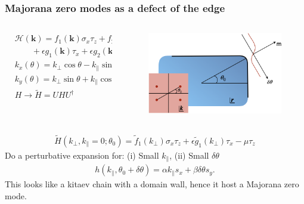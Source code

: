 \documentclass{beamer}
\renewcommand{\(}{\left(}
\renewcommand{\)}{\right)}
\renewcommand{\[}{\left[}
\renewcommand{\]}{\right]}
\begin{document}
\begin{frame}
    \frametitle{Majorana zero modes as a defect of the edge}
    \begin{columns}
        \begin{column}{0.55\textwidth}
            \begin{align*}
                &\mathcal{H}(\bm k) = f_1 (\bm k) \sigma_x\tau_z + f_2(\bm k) \sigma_z\tau_z  \\
                & \qquad + \epsilon g_1(\bm k) \tau_x + \epsilon g_2(\bm k) \tau_y - \mu\tau_z \\ 
                &k_x(\theta)=k_\perp \cos\theta - k_\| \sin\theta \nonumber\\
                &k_y(\theta)=k_\perp \sin\theta + k_\| \cos\theta \\
                &H\to \tilde H= UHU^\dagger \\ 
                \end{align*}
        \end{column}
        \begin{column}{0.45\textwidth}
            \begin{figure}[]
                \centering
                \includegraphics[scale=0.35]{corner_without_C4.png}
            \end{figure}
        \end{column}
    \end{columns}
    \begin{align*}
        \tilde H(k_\perp,k_\|=0;\theta_0)=\tilde f_1(k_\perp)  \sigma_x\tau_z  + \epsilon \tilde g_1(k_\perp) \tau_x  - \mu\tau_z 
    \end{align*}
    Do a perturbative expansion for: 
    (i)  Small $k_\| $, 
    (ii) Small $\delta \theta$
    \begin{align*}
        h(k_{\|}, \theta_0+\delta\theta) = \alpha k_\| s_x + \beta \delta\theta s_y.
    \end{align*}
    This looks like a kitaev chain with a domain wall, hence it host a Majorana zero mode. 
\end{frame}
\end{document}
